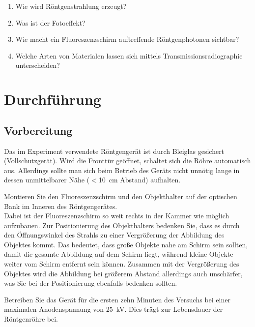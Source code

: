 \begin{enumerate} 
	\item Wie wird Röntgenstrahlung erzeugt?
	\item Was ist der Fotoeffekt?
	\item Wie macht ein Fluoreszenzschirm auftreffende Röntgenphotonen sichtbar?
	\item Welche Arten von Materialen lassen sich mittels Transmissionsradiographie unterscheiden?
\end{enumerate} 

\section{Durchführung} 

\subsection{Vorbereitung}

\begin{hint}
	Das im Experiment verwendete Röntgengerät ist durch Bleiglas gesichert (Vollschutzgerät). Wird die Fronttür geöffnet, schaltet sich die Röhre automatisch aus. Allerdings sollte man sich beim Betrieb des Geräts nicht unnötig lange in dessen unmittelbarer Nähe ($<$10~cm Abstand) aufhalten.
\end{hint}
%
Montieren Sie den Fluoreszenzschirm und den Objekthalter auf der optischen Bank im Inneren des Röntgengerätes. \\
Dabei ist der Fluoreszenzschirm so weit rechts in der Kammer wie möglich aufzubauen. Zur Positionierung des Objekthalters bedenken Sie, dass es durch den Öffnungswinkel des Strahls zu einer Vergrößerung der Abbildung des Objektes kommt. Das bedeutet, dass große Objekte nahe am Schirm sein sollten, damit die gesamte Abbildung auf dem Schirm liegt, während kleine Objekte weiter vom Schirm entfernt sein können. Zusammen mit der Vergrößerung des Objektes wird die Abbildung bei größerem Abstand allerdings auch unschärfer, was Sie  bei der Positionierung ebenfalls bedenken sollten.

\begin{jason}
	Betreiben Sie das Gerät für die ersten zehn Minuten des Versuchs bei einer maximalen Anodenspannung von 25~kV. Dies trägt zur Lebensdauer der Röntgenröhre bei.
\end{jason}

